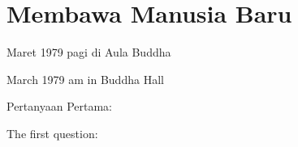 \chapter{Membawa Manusia Baru} %

 Maret 1979 pagi di Aula Buddha

 March 1979 am in Buddha Hall

\bahasa
Pertanyaan Pertama:

\english
The first question:
